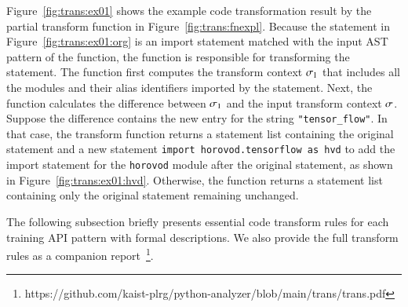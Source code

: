 Figure~\ref{fig:trans:ex01} shows the example code transformation result by the
partial transform function in Figure~\ref{fig:trans:fnexpl}.
Because the statement in Figure~\ref{fig:trans:ex01:org} is an import statement
matched with the input AST pattern of the function, the function is responsible
for transforming the statement.
The function first computes the transform context $\sigma_{1}$ that
includes all the modules and their alias identifiers imported by the statement.
Next, the function calculates the difference between $\sigma_{1}$ and the
input transform context $\sigma$.
Suppose the difference contains the new entry for the string {\tt "tensor\_flow"}.
In that case, the transform function returns a statement list containing the
original statement and a new statement {\tt import horovod.tensorflow as hvd}
to add the import statement for the {\tt horovod} module after the original
statement, as shown in Figure~\ref{fig:trans:ex01:hvd}.  
Otherwise, the function returns a statement list containing only the original
statement remaining unchanged.

The following subsection briefly presents essential code transform rules for
each training API pattern with formal descriptions. 
We also provide the full transform rules as a companion
report~\footnote{https://github.com/kaist-plrg/python-analyzer/blob/main/trans/trans.pdf}.



